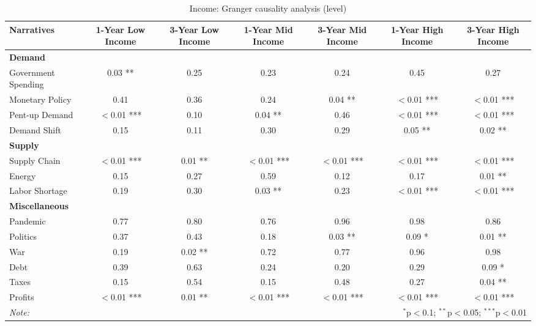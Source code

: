 \begin{sidewaystable}[ht]
\centering
\caption{Income: Granger causality analysis (level)}\label{table:granger}

\begin{tabular}{lcccccc}
 \toprule
\textbf{Narratives} & \textbf{1-Year Low Income} & \textbf{3-Year Low Income} & \textbf{1-Year Mid Income} & \textbf{3-Year Mid Income} & \textbf{1-Year High Income} & \textbf{3-Year High Income} \\
\midrule
\multicolumn{7}{l}{\textbf{Demand}} \\
\midrule
Government Spending & 0.03 ** & 0.25 & 0.23 & 0.24 & 0.45 & 0.27 \\
Monetary Policy & 0.41 & 0.36 & 0.24 & 0.04 ** & $<$0.01 *** & $<$0.01 *** \\
Pent-up Demand & $<$0.01 *** & 0.10 & 0.04 ** & 0.46 & $<$0.01 *** & $<$0.01 *** \\
Demand Shift & 0.15 & 0.11 & 0.30 & 0.29 & 0.05 ** & 0.02 ** \\
\midrule
\multicolumn{7}{l}{\textbf{Supply}} \\
\midrule
Supply Chain & $<$0.01 *** & 0.01 ** & $<$0.01 *** & $<$0.01 *** & $<$0.01 *** & $<$0.01 *** \\
Energy & 0.15 & 0.27 & 0.59 & 0.12 & 0.17 & 0.01 ** \\
Labor Shortage & 0.19 & 0.30 & 0.03 ** & 0.23 & $<$0.01 *** & $<$0.01 *** \\
\midrule
\multicolumn{7}{l}{\textbf{Miscellaneous}} \\
\midrule
Pandemic & 0.77 & 0.80 & 0.76 & 0.96 & 0.98 & 0.86 \\
Politics & 0.37 & 0.43 & 0.18 & 0.03 ** & 0.09 * & 0.01 ** \\
War & 0.19 & 0.02 ** & 0.72 & 0.77 & 0.96 & 0.98 \\
Debt & 0.39 & 0.63 & 0.24 & 0.20 & 0.29 & 0.09 * \\
Taxes & 0.15 & 0.54 & 0.15 & 0.48 & 0.27 & 0.04 ** \\
Profits & $<$0.01 *** & 0.01 ** & $<$0.01 *** & $<$0.01 *** & $<$0.01 *** & $<$0.01 *** \\
\midrule
\bottomrule
\textit{Note:}  & \multicolumn{6}{r}{$^{*}$p$<$0.1; $^{**}$p$<$0.05; $^{***}$p$<$0.01} \\
\bottomrule
\end{tabular}
\end{sidewaystable}
